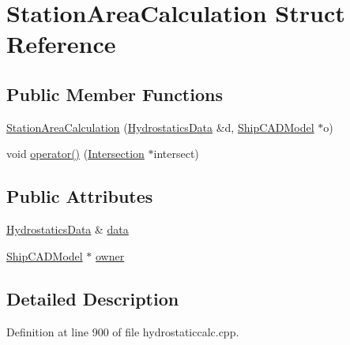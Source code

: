 \hypertarget{structStationAreaCalculation}{\section{Station\-Area\-Calculation Struct Reference}
\label{structStationAreaCalculation}
}
\subsection*{Public Member Functions}
\begin{DoxyCompactItemize}
\item 
\hyperlink{structStationAreaCalculation_aeca509dbb47e4d9eca53b5e0c959dd79}{Station\-Area\-Calculation} (\hyperlink{structShipCAD_1_1HydrostaticsData}{Hydrostatics\-Data} \&d, \hyperlink{classShipCAD_1_1ShipCADModel}{Ship\-C\-A\-D\-Model} $\ast$o)
\item 
void \hyperlink{structStationAreaCalculation_a8f6cf7b08869c75ac1c54bff232ce2ed}{operator()} (\hyperlink{classShipCAD_1_1Intersection}{Intersection} $\ast$intersect)
\end{DoxyCompactItemize}
\subsection*{Public Attributes}
\begin{DoxyCompactItemize}
\item 
\hyperlink{structShipCAD_1_1HydrostaticsData}{Hydrostatics\-Data} \& \hyperlink{structStationAreaCalculation_ad1b380c3cc7135b5d659c7efb5a961c2}{data}
\item 
\hyperlink{classShipCAD_1_1ShipCADModel}{Ship\-C\-A\-D\-Model} $\ast$ \hyperlink{structStationAreaCalculation_a84d2ad6a33b1d6e2db182bebf0a5d7af}{owner}
\end{DoxyCompactItemize}


\subsection{Detailed Description}


Definition at line 900 of file hydrostaticcalc.\-cpp.



